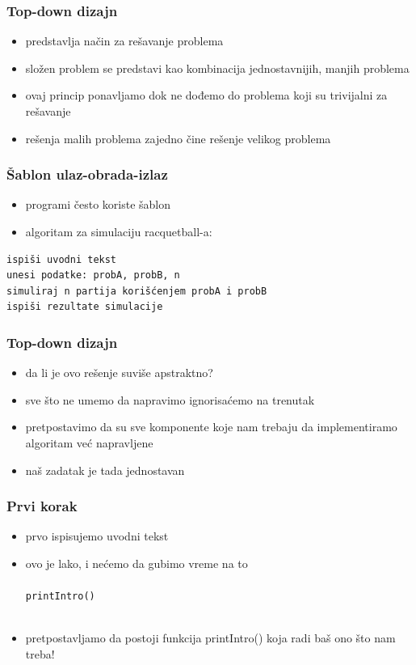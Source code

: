 \documentclass[utf8,compress]{beamer}
\begin{document}
\begin{frame}
  \frametitle{Top-down dizajn}
  \begin{itemize}
    \item {} predstavlja način za rešavanje problema
    \item složen problem se predstavi kao kombinacija jednostavnijih, manjih problema
    \item ovaj princip ponavljamo dok ne dođemo do problema koji su trivijalni za rešavanje
    \item rešenja malih problema zajedno čine rešenje velikog problema
  \end{itemize}
\end{frame}

\begin{frame}[fragile]
  \frametitle{Šablon ulaz-obrada-izlaz}
  \begin{itemize}
    \item programi često koriste šablon 
    \item algoritam za simulaciju racquetball-a:
  \end{itemize}
\begin{verbatim}
ispiši uvodni tekst
unesi podatke: probA, probB, n
simuliraj n partija korišćenjem probA i probB
ispiši rezultate simulacije
\end{verbatim}
\end{frame}

\begin{frame}
  \frametitle{Top-down dizajn}
  \begin{itemize}
    \item da li je ovo rešenje suviše apstraktno? 
    \item sve što ne umemo da napravimo ignorisaćemo na trenutak
    \item pretpostavimo da su sve komponente koje nam trebaju da implementiramo algoritam već napravljene
    \item naš zadatak je tada jednostavan
  \end{itemize}
\end{frame}

\begin{frame}
  \frametitle{Prvi korak}
  \begin{itemize}
    \item prvo ispisujemo uvodni tekst
    \item ovo je lako, i nećemo da gubimo vreme na to \\ \ \\
      \texttt{printIntro()} \\ \ \\
    \item pretpostavljamo da postoji funkcija printIntro() koja radi baš ono što nam treba!
  \end{itemize}
\end{frame}
\end{document}
